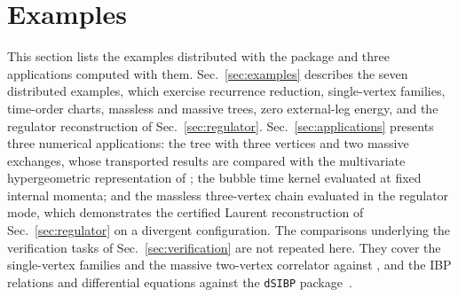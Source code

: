 \documentclass[11pt,a4paper]{article}
\begin{document}
\section{Examples}
\label{sec:examples-section}

This section lists the examples distributed with the package and three applications computed
with them.
Sec.~\ref{sec:examples} describes the seven distributed examples, which exercise
recurrence reduction, single-vertex families, time-order charts, massless and massive trees,
zero external-leg energy, and the regulator reconstruction of Sec.~\ref{sec:regulator}.
Sec.~\ref{sec:applications} presents three numerical applications: the tree with three vertices and
two massive exchanges, whose transported results are compared with the multivariate hypergeometric
representation of \cite{Xianyu:2023ytd}; the bubble time kernel evaluated at fixed internal
momenta; and the massless three-vertex chain evaluated in the regulator mode, which demonstrates
the certified Laurent reconstruction of Sec.~\ref{sec:regulator} on a divergent configuration.
The comparisons underlying the verification tasks of Sec.~\ref{sec:verification} are not repeated
here. They cover the single-vertex families and the massive two-vertex correlator against
\cite{Chen:2024glu}, and the IBP relations and differential equations against the
\texttt{dSIBP} package~\cite{dSIBP:inPreparation}.
\end{document}
